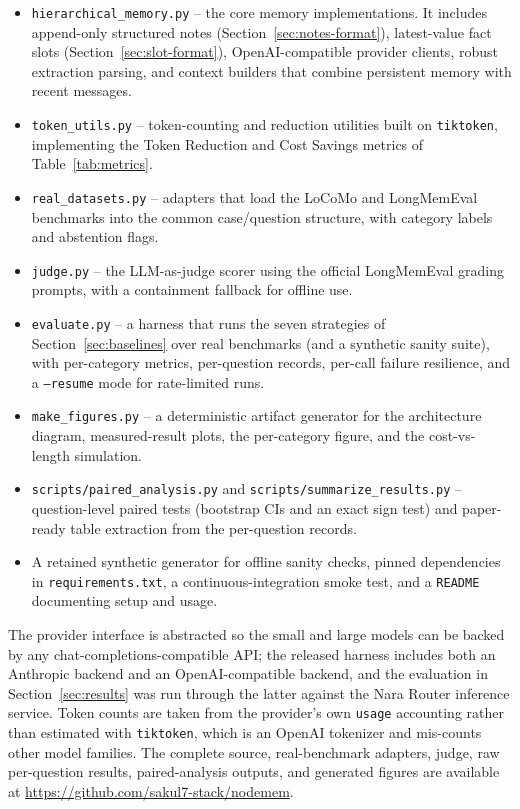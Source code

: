 \documentclass[conference]{IEEEtran}
\begin{document}
\begin{itemize}
    \item \texttt{hierarchical\_memory.py} -- the core memory implementations. It includes append-only structured notes (Section~\ref{sec:notes-format}), latest-value fact slots (Section~\ref{sec:slot-format}), OpenAI-compatible provider clients, robust extraction parsing, and context builders that combine persistent memory with recent messages.
    \item \texttt{token\_utils.py} -- token-counting and reduction utilities built on \texttt{tiktoken}, implementing the Token Reduction and Cost Savings metrics of Table~\ref{tab:metrics}.
    \item \texttt{real\_datasets.py} -- adapters that load the LoCoMo and LongMemEval benchmarks into the common case/question structure, with category labels and abstention flags.
    \item \texttt{judge.py} -- the LLM-as-judge scorer using the official LongMemEval grading prompts, with a containment fallback for offline use.
    \item \texttt{evaluate.py} -- a harness that runs the seven strategies of Section~\ref{sec:baselines} over real benchmarks (and a synthetic sanity suite), with per-category metrics, per-question records, per-call failure resilience, and a \texttt{--resume} mode for rate-limited runs.
    \item \texttt{make\_figures.py} -- a deterministic artifact generator for the architecture diagram, measured-result plots, the per-category figure, and the cost-vs-length simulation.
    \item \texttt{scripts/paired\_analysis.py} and \texttt{scripts/summarize\_results.py} -- question-level paired tests (bootstrap CIs and an exact sign test) and paper-ready table extraction from the per-question records.
    \item A retained synthetic generator for offline sanity checks, pinned dependencies in \texttt{requirements.txt}, a continuous-integration smoke test, and a \texttt{README} documenting setup and usage.
\end{itemize}

The provider interface is abstracted so the small and large models can be backed by any chat-completions-compatible API; the released harness includes both an Anthropic backend and an OpenAI-compatible backend, and the evaluation in Section~\ref{sec:results} was run through the latter against the Nara Router inference service. Token counts are taken from the provider's own \texttt{usage} accounting rather than estimated with \texttt{tiktoken}, which is an OpenAI tokenizer and mis-counts other model families. The complete source, real-benchmark adapters, judge, raw per-question results, paired-analysis outputs, and generated figures are available at \url{https://github.com/sakul7-stack/nodemem}.
\end{document}
